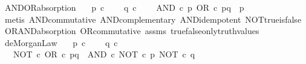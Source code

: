 \begin{isabellebody}
\endisatagproof
{\isafoldproof}%
%
\isadelimproof
\isanewline
%
\endisadelimproof
\isanewline
{}\isamarkupfalse%
\ AND{\isacharunderscore}{\kern0pt}OR{\isacharunderscore}{\kern0pt}absorption{\isacharcolon}{\kern0pt}\isanewline
\ \ \ {\isachardoublequoteopen}p\ {\isasymin}\isactrlsub c\ {\isasymOmega}{\isachardoublequoteclose}\isanewline
\ \ \ {\isachardoublequoteopen}q\ {\isasymin}\isactrlsub c\ {\isasymOmega}{\isachardoublequoteclose}\isanewline
\ \ \ {\isachardoublequoteopen}AND\ {\isasymcirc}\isactrlsub c\ {\isasymlangle}p{\isacharcomma}{\kern0pt}\ OR\ {\isasymcirc}\isactrlsub c\ {\isasymlangle}p{\isacharcomma}{\kern0pt}q{\isasymrangle}{\isasymrangle}\ {\isacharequal}{\kern0pt}\ p{\isachardoublequoteclose}\isanewline
%
\isadelimproof
\ \ %
\endisadelimproof
%
\isatagproof
{}\isamarkupfalse%
\ {\isacharparenleft}{\kern0pt}metis\ AND{\isacharunderscore}{\kern0pt}commutative\ AND{\isacharunderscore}{\kern0pt}complementary\ AND{\isacharunderscore}{\kern0pt}idempotent\ NOT{\isacharunderscore}{\kern0pt}true{\isacharunderscore}{\kern0pt}is{\isacharunderscore}{\kern0pt}false\ OR{\isacharunderscore}{\kern0pt}AND{\isacharunderscore}{\kern0pt}absorption\ OR{\isacharunderscore}{\kern0pt}commutative\ assms\ true{\isacharunderscore}{\kern0pt}false{\isacharunderscore}{\kern0pt}only{\isacharunderscore}{\kern0pt}truth{\isacharunderscore}{\kern0pt}values{\isacharparenright}{\kern0pt}%
\endisatagproof
{\isafoldproof}%
%
\isadelimproof
\isanewline
%
\endisadelimproof
\isanewline
{}\isamarkupfalse%
\ deMorgan{\isacharunderscore}{\kern0pt}Law{}{\isacharcolon}{\kern0pt}\isanewline
\ \ \ {\isachardoublequoteopen}p\ {\isasymin}\isactrlsub c\ {\isasymOmega}{\isachardoublequoteclose}\isanewline
\ \ \ {\isachardoublequoteopen}q\ {\isasymin}\isactrlsub c\ {\isasymOmega}{\isachardoublequoteclose}\isanewline
\ \ \ {\isachardoublequoteopen}NOT\ {\isasymcirc}\isactrlsub c\ OR\ {\isasymcirc}\isactrlsub c\ {\isasymlangle}p{\isacharcomma}{\kern0pt}q{\isasymrangle}\ {\isacharequal}{\kern0pt}\ AND\ {\isasymcirc}\isactrlsub c\ {\isasymlangle}NOT\ {\isasymcirc}\isactrlsub c\ p{\isacharcomma}{\kern0pt}\ NOT\ {\isasymcirc}\isactrlsub c\ q{\isasymrangle}{\isachardoublequoteclose}\isanewline
%
\isadelimproof
\ \ %
\endisadelimproof
%
\isatagproof
{}\isamarkupfalse%

\end{isabellebody}
